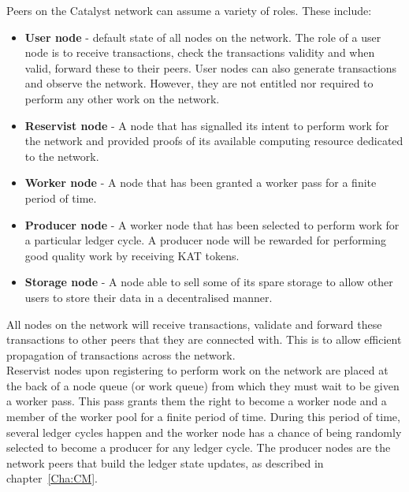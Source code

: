 Peers on the Catalyst network can assume a variety of roles. These include:

\begin{itemize}

\item \textbf{User node} - default state of all nodes on the network. The role of a user node is to receive transactions, check the transactions validity and when valid, forward these to their peers. User nodes can also generate transactions and observe the network. However, they are not entitled nor required to perform any other work on the network. 

\item \textbf{Reservist node} - A node that has signalled  its intent to perform work for the network and provided proofs of its available computing resource dedicated to the network.

\item \textbf{Worker node} - A node that has been granted a worker pass for a finite period of time. 

\item \textbf{Producer node} - A worker node that has been selected to perform work for a particular ledger cycle. A producer node will be rewarded for performing good quality work by receiving KAT tokens. 

\item \textbf{Storage node} - A node able to sell some of its spare storage to allow other users to store their data in a decentralised manner. 

\end{itemize}

All nodes on the network will receive transactions, validate and forward these transactions to other peers that they are connected with. This is to allow efficient propagation of transactions across the network. \\

Reservist nodes upon registering to perform work on the network are placed at the back of a node queue (or work queue) from which they must wait to be given a worker pass. This pass grants them the right to become a worker node and a member of the worker pool for a finite period of time. During this period of time, several ledger cycles happen and the worker node has a chance of being randomly selected to become a producer for any ledger cycle. The producer nodes are the network peers that build the ledger state updates, as described in chapter~\ref{Cha:CM}. 
